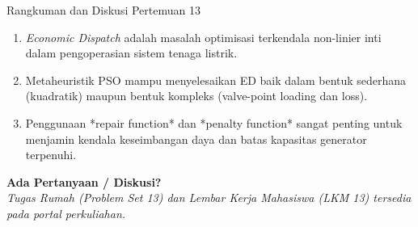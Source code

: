 \documentclass[10pt,aspectratio=169]{beamer}
\begin{document}
\begin{frame}{Rangkuman dan Diskusi Pertemuan 13}
    \begin{tcolorbox}[colback=unibblue!10,colframe=unibblue,title=\textbf{Poin Kunci}]
        \begin{enumerate}
            \item \textit{Economic Dispatch} adalah masalah optimisasi terkendala non-linier inti dalam pengoperasian sistem tenaga listrik.
            \item Metaheuristik PSO mampu menyelesaikan ED baik dalam bentuk sederhana (kuadratik) maupun bentuk kompleks (valve-point loading dan loss).
            \item Penggunaan *repair function* dan *penalty function* sangat penting untuk menjamin kendala keseimbangan daya dan batas kapasitas generator terpenuhi.
        \end{enumerate}
    \end{tcolorbox}

    \vspace{0.4cm}
    \begin{center}
        \Large \textbf{Ada Pertanyaan / Diskusi?} \\
        \vspace{0.2cm}
        \small \textit{Tugas Rumah (Problem Set 13) dan Lembar Kerja Mahasiswa (LKM 13) tersedia pada portal perkuliahan.}
    \end{center}
\end{frame}
\end{document}

